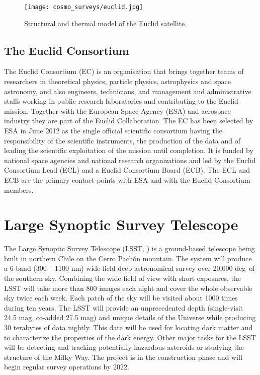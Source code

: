\begin{figure}[ht]
    \centering
    \texttt{[image: cosmo\_surveys/euclid.jpg]}
    \caption{Structural and thermal model of the Euclid satellite.}
    \label{fig:euclid}
\end{figure}
\subsection{The Euclid Consortium}
The Euclid Consortium (EC) is an organisation that brings together teams of researchers in theoretical physics, particle physics, astrophysics and space astronomy, and also engineers, technicians, and management and administrative staffs working in public research laboratories and contributing to the Euclid mission. Together with the European Space Agency (ESA) and aerospace industry they are part of the Euclid Collaboration. The EC has been selected by ESA in June 2012 as the single official scientific consortium having the responsibility of the scientific instruments, the production of the data and of leading the scientific exploitation of the mission until completion. It is funded by national space agencies and national research organizations and led by the Euclid Consortium Lead (ECL) and a Euclid Consortium Board (ECB). The ECL and ECB are the primary contact points with ESA and with the Euclid Consortium members.

\section{Large Synoptic Survey Telescope}
The Large Synoptic Survey Telescope (LSST, \cite{lsst}) is a ground-based telescope being built in northern Chile on the Cerro Pach\'{o}n mountain. The system will produce a 6-band (300 -- 1100 nm) wide-field deep astronomical survey over 20,000 deg\sq\ of the southern sky. Combining the wide field of view with short exposures, the LSST will take more than 800 images each night and cover the whole observable sky twice each week. Each patch of the sky will be visited about 1000 times during ten years. The LSST will provide an unprecedented depth (single-visit 24.5 mag, co-added 27.5 mag) and unique details of the Universe while producing 30 terabytes of data nightly. This data will be used for locating dark matter and to characterize the properties of the dark energy. Other major tasks for the LSST will be detecting and tracking potentially hazardous asteroids or studying the structure of the Milky Way. The project is in the construction phase and will begin regular survey operations by 2022.

